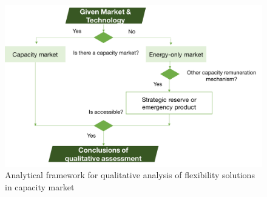 \begin{figure}[h!]
	\centering
	\includegraphics[width=0.95\linewidth]{Figures/Q_capacity}
	\caption{Analytical framework for qualitative analysis of flexibility solutions in capacity market}
	\label{fig:qualitative-capacity}
\end{figure}

